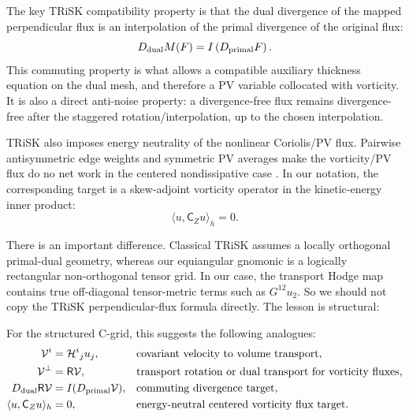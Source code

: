 \documentclass[11pt]{article}
\newcommand{\mc}[1]{\mathcal{#1}}
\newcommand{\msf}[1]{\mathsf{#1}}
\newcommand{\code}[1]{\texttt{\detokenize{#1}}}
\newcommand{\Hodge}{\mc{H}}
\newcommand{\Vflux}{\mc{V}}
\begin{document}
The key TRiSK compatibility property is that the dual divergence of the mapped perpendicular flux is an interpolation of the primal divergence of the original flux:
\begin{equation}
  D_{\rm dual} M(F)
  =
  I\left(D_{\rm primal}F\right).
  \label{eq:trisk-commuting-diagram}
\end{equation}
This commuting property is what allows a compatible auxiliary thickness equation on the dual mesh, and therefore a PV variable collocated with vorticity.  It is also a direct anti-noise property: a divergence-free flux remains divergence-free after the staggered rotation/interpolation, up to the chosen interpolation.

TRiSK also imposes energy neutrality of the nonlinear Coriolis/PV flux.  Pairwise antisymmetric edge weights and symmetric PV averages make the vorticity/PV flux do no net work in the centered nondissipative case \citep{Ringler2010}.  In our notation, the corresponding target is a skew-adjoint vorticity operator in the kinetic-energy inner product:
\begin{equation}
  \langle u,\msf{C}_Z u\rangle_h = 0.
  \label{eq:energy-neutral-coriolis}
\end{equation}

There is an important difference.  Classical TRiSK assumes a locally orthogonal primal-dual geometry, whereas our equiangular gnomonic \code{SphericalShellGrid} is a logically rectangular non-orthogonal tensor grid.  In our case, the transport Hodge map contains true off-diagonal tensor-metric terms such as \(G^{12}u_2\).  So we should not copy the TRiSK perpendicular-flux formula directly.  The lesson is structural:
\begin{center}
\end{center}

For the structured C-grid, this suggests the following analogues:
\begin{align}
  \Vflux^i &= \Hodge^i{}_j u_j, &&\hbox{covariant velocity to volume transport}, \\
  \Vflux^\perp &= \msf{R}\Vflux, &&\hbox{transport rotation or dual transport for vorticity fluxes}, \\
  D_{\rm dual}\msf{R}\Vflux &= I(D_{\rm primal}\Vflux), &&\hbox{commuting divergence target}, \\
  \langle u,\msf{C}_Z u\rangle_h &= 0, &&\hbox{energy-neutral centered vorticity flux target}.
\end{align}
\end{document}
